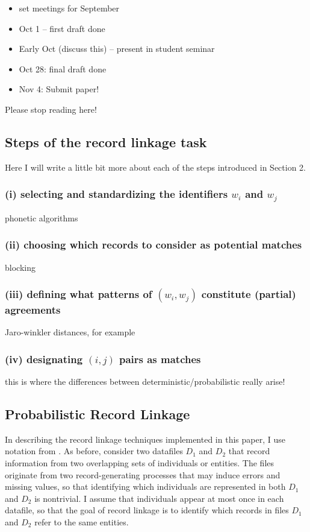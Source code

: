\documentclass[12pt]{article}
\begin{document}
\begin{itemize}
\item set meetings for September
\item Oct 1 -- first draft done
\item Early Oct (discuss this) -- present in student seminar
\item Oct 28: final draft done
\item Nov 4: Submit paper! 
\end{itemize}





\newpage
Please stop reading here! 
\subsection{Steps of the record linkage task}

Here I will write a little bit more about each of the steps introduced in Section 2. 

\subsubsection*{(i) selecting and standardizing the identifiers $w_i$ and $w_j$}
phonetic algorithms

\subsubsection*{(ii) choosing which records to consider as potential matches}
blocking 

\subsubsection*{(iii) defining what patterns of $(w_i,w_j)$ constitute (partial) agreements}
Jaro-winkler distances, for example  

\subsubsection{(iv) designating $(i,j)$ pairs as matches}
this is where the differences between deterministic/probabilistic really arise! 

\subsection{Probabilistic Record Linkage}
In describing the record linkage techniques implemented in this paper, I use notation from \cite{fellegi69}.  As before, consider two datafiles $D_1$ and $D_2$ that record information from two overlapping sets of individuals or entities.  The files originate from two record-generating processes that may induce errors and missing values, so that identifying which individuals are represented in both $D_1$ and $D_2$ is nontrivial.  I assume that individuals appear at most once in each datafile, so that the goal of record linkage is to identify which records in files $D_1$ and $D_2$ refer to the same entities.
\end{document}
